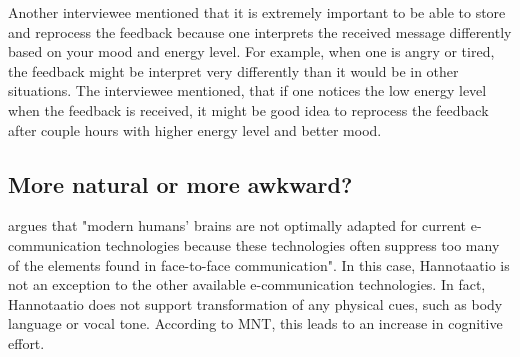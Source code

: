\documentclass[english,12pt,a4paper,pdftex]{article}
\newcommand{\q}[2]{
\begin{quote}
\emph{(IW #1): #2}
\end{quote}}
\begin{document}
Another interviewee mentioned that it is extremely important to be able to store and reprocess the feedback because one interprets the received message differently based on your mood and energy level. For example, when one is angry or tired, the feedback might be interpret very differently than it would be in other situations. The interviewee mentioned, that if one notices the low energy level when the feedback is received, it might be good idea to reprocess the feedback after couple hours with higher energy level and better mood.

\subsection{More natural or more awkward?}

\citet{kock2005} argues that "modern humans' brains are not optimally adapted for current e-communication technologies because these technologies often suppress too many of the elements found in face-to-face communication". In this case, Hannotaatio is not an exception to the other available e-communication technologies. In fact, Hannotaatio does not support transformation of any physical cues, such as body language or vocal tone. According to \ac{MNT}, this leads to an increase in cognitive effort.
\end{document}
